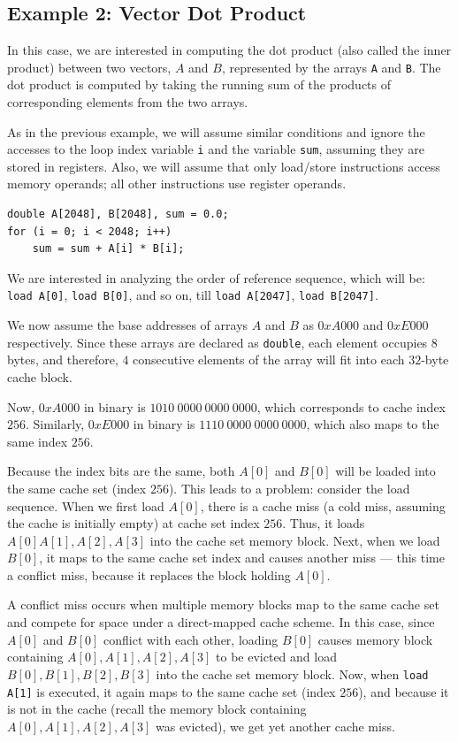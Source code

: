 \documentclass[12pt]{book}
\begin{document}
\subsection{Example 2: Vector Dot Product}
In this case, we are interested in computing the dot product (also called the inner product) between two vectors, $A$ and $B$, represented by the arrays \texttt{A} and \texttt{B}. The dot product is computed by taking the running sum of the products of corresponding elements from the two arrays. 

As in the previous example, we will assume similar conditions and ignore the accesses to the loop index variable \texttt{i} and the variable \texttt{sum}, assuming they are stored in registers. Also, we will assume that only load/store instructions access memory operands; all other instructions use register operands.

\begin{lstlisting}[caption={Vector Dot Product}]
double A[2048], B[2048], sum = 0.0;
for (i = 0; i < 2048; i++) 
    sum = sum + A[i] * B[i];
\end{lstlisting}

We are interested in analyzing the order of reference sequence, which will be: \texttt{load A[0]}, \texttt{load B[0]}, and so on, till \texttt{load A[2047]}, \texttt{load B[2047]}.

We now assume the base addresses of arrays $A$ and $B$ as $0xA000$ and $0xE000$ respectively. Since these arrays are declared as \texttt{double}, each element occupies $8$ bytes, and therefore, $4$ consecutive elements of the array will fit into each $32$-byte cache block.

Now, $0xA000$ in binary is $1010\ 0000\ 0000\ 0000$, which corresponds to cache index $256$. Similarly, $0xE000$ in binary is $1110\ 0000\ 0000\ 0000$, which also maps to the same index $256$.

Because the index bits are the same, both $A[0]$ and $B[0]$ will be loaded into the same cache set (index $256$). This leads to a problem: consider the load sequence. When we first load $A[0]$, there is a cache miss (a cold miss, assuming the cache is initially empty) at cache set index $256$. Thus, it loads $A[0] A[1], A[2], A[3]$ into the cache set memory block. Next, when we load $B[0]$, it maps to the same cache set index and causes another miss — this time a conflict miss, because it replaces the block holding $A[0]$.

A conflict miss occurs when multiple memory blocks map to the same cache set and compete for space under a direct-mapped cache scheme. In this case, since $A[0]$ and $B[0]$ conflict with each other, loading $B[0]$ causes memory block containing $A[0], A[1], A[2], A[3]$ to be evicted and load $B[0], B[1], B[2], B[3]$ into the cache set memory block. Now, when \texttt{load A[1]} is executed, it again maps to the same cache set (index $256$), and because it is not in the cache (recall the memory block containing $A[0], A[1], A[2], A[3]$ was evicted), we get yet another cache miss.
\end{document}
